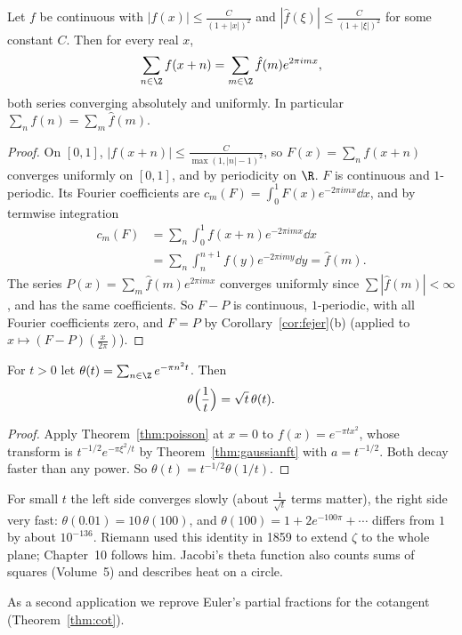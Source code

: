 \begin{theorem}\label{thm:poisson}
Let $f$ be continuous with $|f(x)|\le\frac C{(1+|x|)^2}$ and $|\hat f(\xi)|\le\frac C{(1+|\xi|)^2}$ for some constant $C$. Then for every real $x$,
\[
\sum_{n\in\Z}f(x+n)=\sum_{m\in\Z}\hat f(m)e^{2\pi imx},
\]
both series converging absolutely and uniformly. In particular $\sum_nf(n)=\sum_m\hat f(m)$.
\end{theorem}
\begin{proof}
On $[0,1]$, $|f(x+n)|\le\frac C{\max(1,|n|-1)^2}$, so $F(x)=\sum_nf(x+n)$ converges uniformly on $[0,1]$, and by periodicity on $\R$. $F$ is continuous
and $1$-periodic. Its Fourier coefficients are $c_m(F)=\int_0^1F(x)e^{-2\pi imx}\dd x$, and by termwise integration
\[
\begin{aligned}c_m(F)&=\sum_n\int_0^1f(x+n)e^{-2\pi imx}\dd x\\&=\sum_n\int_n^{n+1}f(y)e^{-2\pi imy}\dd y=\hat f(m).\end{aligned}
\]
The series $P(x)=\sum_m\hat f(m)e^{2\pi imx}$ converges uniformly since $\sum|\hat f(m)|<\infty$, and has the same coefficients. So $F-P$ is continuous,
$1$-periodic, with all Fourier coefficients zero, and $F=P$ by Corollary~\ref{cor:fejer}(b) (applied to $x\mapsto(F-P)(\frac x{2\pi})$).
\end{proof}

\begin{corollary}\label{cor:theta}
For $t>0$ let $\theta(t)=\sum_{n\in\Z}e^{-\pi n^2t}$. Then
\[
\theta\Bigl(\frac1t\Bigr)=\sqrt t\,\theta(t).
\]
\end{corollary}
\begin{proof}
Apply Theorem~\ref{thm:poisson} at $x=0$ to $f(x)=e^{-\pi tx^2}$, whose transform is $t^{-1/2}e^{-\pi\xi^2/t}$ by Theorem~\ref{thm:gaussianft} with $a=t^{-1/2}$. Both decay faster
than any power. So $\theta(t)=t^{-1/2}\theta(1/t)$.
\end{proof}

For small $t$ the left side converges slowly (about $\frac1{\sqrt t}$ terms matter), the right side very fast: $\theta(0.01)=10\,\theta(100)$, and
$\theta(100)=1+2e^{-100\pi}+\cdots$ differs from $1$ by about $10^{-136}$. Riemann used this identity in 1859 to extend $\zeta$ to the whole
plane; Chapter~10 follows him. Jacobi's theta function also counts sums of squares (Volume~5) and describes heat on a circle.

As a second application we reprove Euler's partial fractions for the cotangent (Theorem~\ref{thm:cot}).

